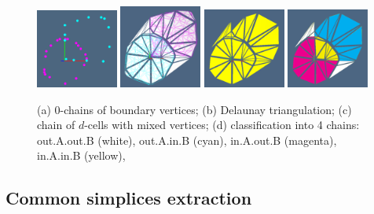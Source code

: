 \documentclass[11pt,oneside]{article}	%
\begin{document}
\begin{figure}[htbp] %
   \centering
   \includegraphics[height=0.24\textwidth,width=0.24\textwidth]{images/chains1} 
   \includegraphics[height=0.24\textwidth,width=0.24\textwidth]{images/chains2} 
   \includegraphics[height=0.24\textwidth,width=0.24\textwidth]{images/chains3} 
   \includegraphics[height=0.24\textwidth,width=0.24\textwidth]{images/chains4} 
   \caption{(a) 0-chains of boundary vertices; (b) Delaunay triangulation; (c) chain of $d$-cells with mixed vertices; (d) classification into 4 chains: out.A.out.B (white), out.A.in.B (cyan), in.A.out.B (magenta), in.A.in.B (yellow),}
   \label{fig:example}
\end{figure}

\subsection{Common simplices extraction}
\end{document}
